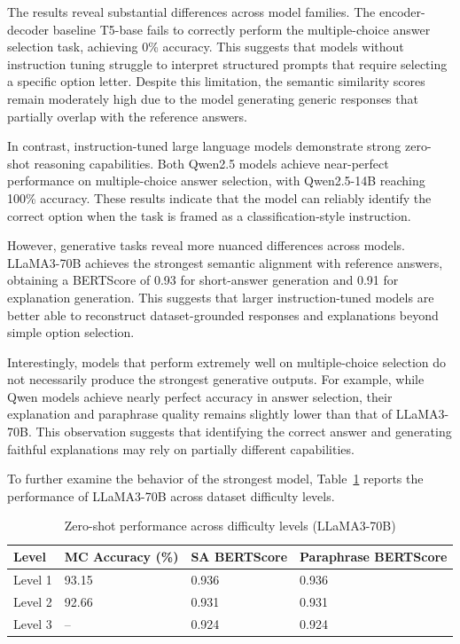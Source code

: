 \documentclass[a4paper,fleqn]{cas-sc}
\begin{document}
The results reveal substantial differences across model families. The encoder-decoder baseline T5-base fails to correctly perform the multiple-choice answer selection task, achieving 0\% accuracy. This suggests that models without instruction tuning struggle to interpret structured prompts that require selecting a specific option letter. Despite this limitation, the semantic similarity scores remain moderately high due to the model generating generic responses that partially overlap with the reference answers.

In contrast, instruction-tuned large language models demonstrate strong zero-shot reasoning capabilities. Both Qwen2.5 models achieve near-perfect performance on multiple-choice answer selection, with Qwen2.5-14B reaching 100\% accuracy. These results indicate that the model can reliably identify the correct option when the task is framed as a classification-style instruction.

However, generative tasks reveal more nuanced differences across models. LLaMA3-70B achieves the strongest semantic alignment with reference answers, obtaining a BERTScore of 0.93 for short-answer generation and 0.91 for explanation generation. This suggests that larger instruction-tuned models are better able to reconstruct dataset-grounded responses and explanations beyond simple option selection.

Interestingly, models that perform extremely well on multiple-choice selection do not necessarily produce the strongest generative outputs. For example, while Qwen models achieve nearly perfect accuracy in answer selection, their explanation and paraphrase quality remains slightly lower than that of LLaMA3-70B. This observation suggests that identifying the correct answer and generating faithful explanations may rely on partially different capabilities.

To further examine the behavior of the strongest model, Table~\ref{tab:zeroshot_levels} reports the performance of LLaMA3-70B across dataset difficulty levels.

\begin{table}[H]
\centering
\caption{Zero-shot performance across difficulty levels (LLaMA3-70B)}
\label{tab:zeroshot_levels}
\begin{tabular}{|p{1.5cm}|p{2cm}|p{2cm}|p{2cm}|}
\hline
Level & MC Accuracy (\%) & SA BERTScore & Paraphrase BERTScore \\
\hline
Level 1 & 93.15 & 0.936 & 0.936 \\
Level 2 & 92.66 & 0.931 & 0.931 \\
Level 3 & -- & 0.924 & 0.924 \\
\hline
\end{tabular}
\end{table}
\end{document}

